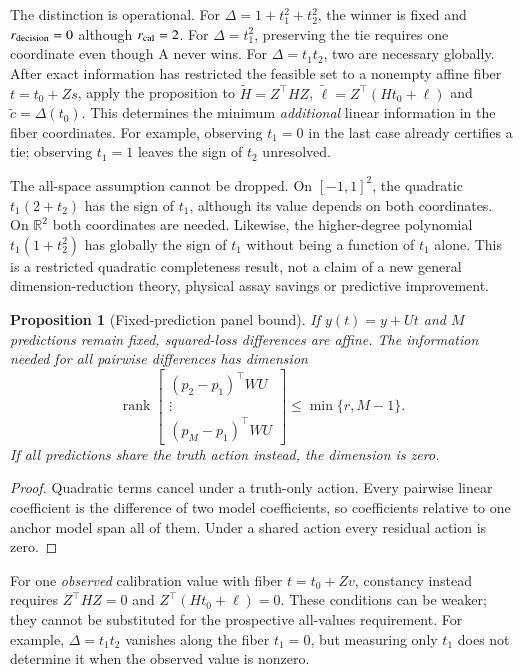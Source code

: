 \documentclass[11pt]{article}
\newtheorem{proposition}{Proposition}
\DeclareMathOperator{\rank}{rank}\DeclareMathOperator{\kerop}{ker}
\begin{document}
The distinction is operational. For $\Delta=1+t_1^2+t_2^2$, the winner is fixed and $r_{\rm decision}=0$ although $r_{\rm cal}=2$. For $\Delta=t_1^2$, preserving the tie requires one coordinate even though A never wins. For $\Delta=t_1t_2$, two are necessary globally. After exact information has restricted the feasible set to a nonempty affine fiber $t=t_0+Zs$, apply the proposition to $\widetilde H=Z^\top HZ$, $\widetilde\ell=Z^\top(Ht_0+\ell)$ and $\widetilde c=\Delta(t_0)$. This determines the minimum \emph{additional} linear information in the fiber coordinates. For example, observing $t_1=0$ in the last case already certifies a tie; observing $t_1=1$ leaves the sign of $t_2$ unresolved.

The all-space assumption cannot be dropped. On $[-1,1]^2$, the quadratic $t_1(2+t_2)$ has the sign of $t_1$, although its value depends on both coordinates. On $\mathbb R^2$ both coordinates are needed. Likewise, the higher-degree polynomial $t_1(1+t_2^2)$ has globally the sign of $t_1$ without being a function of $t_1$ alone. This is a restricted quadratic completeness result, not a claim of a new general dimension-reduction theory, physical assay savings or predictive improvement.

\begin{proposition}[Fixed-prediction panel bound]
If $y(t)=y+Ut$ and $M$ predictions remain fixed, squared-loss differences are affine. The information needed for all pairwise differences has dimension
\[
\rank\!\begin{bmatrix}(p_2-p_1)^\top WU\\\vdots\\(p_M-p_1)^\top WU\end{bmatrix}\le\min\{r,M-1\}.
\]
If all predictions share the truth action instead, the dimension is zero.
\end{proposition}
\begin{proof}
Quadratic terms cancel under a truth-only action. Every pairwise linear coefficient is the difference of two model coefficients, so coefficients relative to one anchor model span all of them. Under a shared action every residual action is zero.
\end{proof}
For one \emph{observed} calibration value with fiber $t=t_0+Zv$, constancy instead requires $Z^\top HZ=0$ and $Z^\top(Ht_0+\ell)=0$. These conditions can be weaker; they cannot be substituted for the prospective all-values requirement. For example, $\Delta=t_1t_2$ vanishes along the fiber $t_1=0$, but measuring only $t_1$ does not determine it when the observed value is nonzero.
\end{document}
